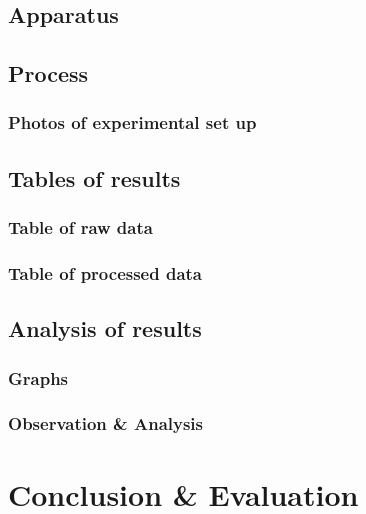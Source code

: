 \documentclass[12pt]{article}
\begin{document}
\begin{flushleft}
            \subsection{Apparatus}
                
            \subsection{Process}
                
                \subsubsection*{Photos of experimental set up}
                    
            \subsection{Tables of results}
                \FloatBarrier 
                \subsubsection*{Table of raw data}
                    
                \subsubsection*{Table of processed data}
                    
            \subsection{Analysis of results}
                \subsubsection*{Graphs}    
                    
                \subsubsection*{Observation \& Analysis}
                    
        \section{Conclusion \& Evaluation}
            
        
        
    \end{flushleft}
\end{document}
